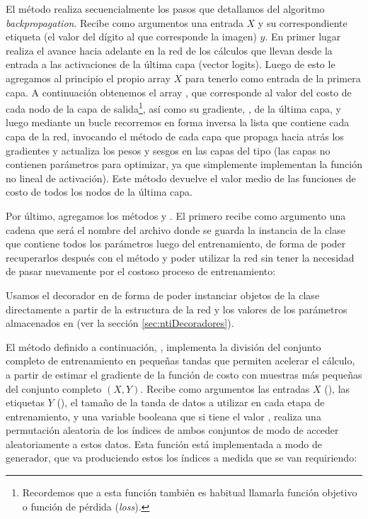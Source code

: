 El método  realiza secuencialmente los pasos que detallamos del algoritmo \textit{backpropagation}. Recibe como argumentos una entrada $X$ y su correspondiente etiqueta (el valor del dígito al que corresponde la imagen) $y$. En primer lugar realiza el avance hacia adelante en la red de los cálculos que llevan desde la entrada a las activaciones de la última capa (vector logits). Luego de esto le agregamos al principio el propio array $X$ para tenerlo como entrada de la primera capa. A continuación obtenemos el array , que corresponde al valor del costo de cada nodo de la capa de salida\footnote{Recordemos que a esta función también es habitual llamarla función objetivo o función de pérdida (\textit{loss}).}, así como su gradiente, , de la última capa, y luego mediante un bucle  recorremos en forma inversa la lista que contiene cada capa  de la red, invocando el método  de cada capa que propaga hacia atrás los gradientes y actualiza los pesos y sesgos en las capas del tipo  (las capas  no contienen parámetros para optimizar, ya que simplemente implementan la función no lineal de activación). Este método devuelve el valor medio de las funciones de costo de todos los nodos de la última capa.


Por último, agregamos los métodos  y . El primero recibe como argumento una cadena que será el nombre del archivo donde se guarda la instancia de la clase  que contiene todos los parámetros luego del entrenamiento, de forma de poder recuperarlos después con el método  y poder utilizar la red sin tener la necesidad de pasar nuevamente por el costoso proceso de entrenamiento:


Usamos el decorador  en  de forma de poder instanciar objetos de la clase  directamente a partir de la estructura de la red y los valores de los parámetros almacenados en  (ver la sección \ref{sec:ntiDecoradores}).

El método definido a continuación, , implementa la división del conjunto completo de entrenamiento en pequeñas tandas que permiten acelerar el cálculo, a partir de estimar el gradiente de la función de costo con muestras más pequeñas del conjunto completo $(X, Y)$. Recibe como argumentos las entradas $X$ (), las etiquetas $Y$ (), el tamaño de la tanda de datos a utilizar en cada etapa de entrenamiento, y una variable booleana  que si tiene el valor , realiza una permutación aleatoria de los índices de ambos conjuntos de modo de acceder aleatoriamente a estos datos. Esta función está implementada a modo de generador, que va produciendo estos los índices a medida que se van requiriendo:

